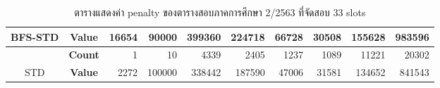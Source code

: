 \begin{table}[]
{\begin{tabular}{@{}ccrrrrrrrr@{}}
    \multirow{-2}{*}{BFS-STD}                    & \textbf{Value}                        & 16654                          & 90000                          & 399360                         & 224718                         & 66728                          & 30508                          & 155628                         & 983596                           \\ \midrule
                                                  & {\textbf{Count}} & {1}       & {10}      & {4339}    & {2405}    & {1237}    & {1089}    & {11221}   & {20302}     \\ \cmidrule(l){2-10} 
    \multirow{-2}{*}{STD} & {\textbf{Value}} & {2272}    & {100000}  & {338442}  & {187590}  & {47006}   & {31581}   & {134652}  & {841543}    \\ \bottomrule
    \end{tabular}%
    }
    \caption{ตารางแสดงค่า penalty ของตารางสอบภาคการศึกษา 2/2563 ที่จัดสอบ 33 slots}
    \label{tab:result_table_263_33}
\end{table}
